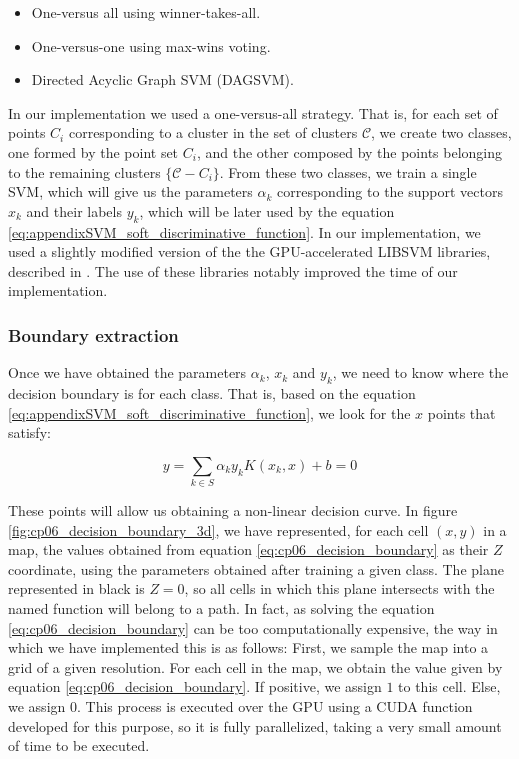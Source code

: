 \begin{itemize}
 \item One-versus all using winner-takes-all.
 \item One-versus-one using max-wins voting.
 \item Directed Acyclic Graph SVM (DAGSVM).
\end{itemize}

In our implementation we used a one-versus-all strategy. That is, for each set of points $C_i$ corresponding to a cluster in the set of clusters $\mathcal{C}$, we create two classes, one formed by the point set $C_i$, and the other composed by the points belonging to the remaining clusters $\{\mathcal{C} - C_i\}$. From these two classes, we train a single \ac{SVM}, which will give us the parameters $\alpha_k$ corresponding to the support vectors $x_k$ and their labels $y_k$, which will be later used by the equation \ref{eq:appendixSVM_soft_discriminative_function}. In our implementation, we used a slightly modified version of the the \acf{GPU}-accelerated LIBSVM libraries, described in \cite{athanasopoulos2011gpu}. The use of these libraries notably improved the time of our implementation.

\subsubsection{Boundary extraction}\label{ch:chapter06_01_01_04}

Once we have obtained the parameters $\alpha_k$, $x_k$ and $y_k$, we need to know where the decision boundary is for each class. That is, based on the equation \ref{eq:appendixSVM_soft_discriminative_function}, we look for the $x$ points that satisfy:

\begin{equation}\label{eq:cp06_decision_boundary}
 y = \sum_{k \in S} \alpha_k y_k K(x_k, x) + b = 0
\end{equation}

These points will allow us obtaining a non-linear decision curve. In figure \ref{fig:cp06_decision_boundary_3d}, we have represented, for each cell $(x,y)$ in a map, the values obtained from equation \ref{eq:cp06_decision_boundary} as their $Z$ coordinate, using the parameters obtained after training a given class. The plane represented in black is $Z=0$, so all cells in which this plane intersects with the named function will belong to a path.
In fact, as solving the equation \ref{eq:cp06_decision_boundary} can be too computationally expensive, the way in which we have implemented this is as follows: First, we sample the map into a grid of a given resolution. For each cell in the map, we obtain the value given by equation \ref{eq:cp06_decision_boundary}. If positive, we assign $1$ to this cell. Else, we assign $0$. This process is executed over the \ac{GPU} using a \ac{CUDA} function developed for this purpose, so it is fully parallelized, taking a very small amount of time to be executed.

